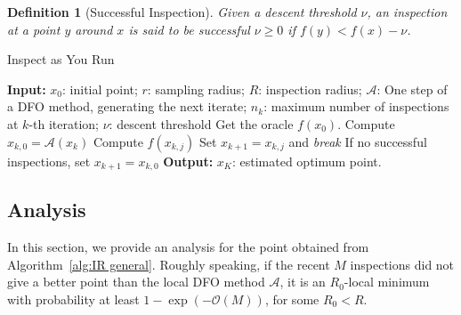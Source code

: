\documentclass[sn-mathphys,Numbered]{sn-jnl}
\theoremstyle{thmstyleone}
\theoremstyle{thmstyletwo}
\theoremstyle{thmstylethree}
\newtheorem{definition}{Definition}
\begin{document}
\begin{definition}[Successful Inspection] Given a descent threshold $\nu$, an inspection at a point $y$ around $x$ is said to be successful $\nu \geq 0$ if $f(y) < f(x) - \nu$.
\end{definition}


\begin{algorithm}[H]
\caption{Inspect as You Run}
 \label{alg:IR general}
\begin{algorithmic}[1]
  \State \textbf{Input:} $x_0$: initial point; $r$: sampling radius; $R$: inspection radius; $\mathcal{A}$: One step of a DFO method, generating the next iterate; $n_k$: maximum number of inspections at $k$-th iteration; $\nu$: descent threshold
  \State Get the oracle $f(x_0)$.
        \State Compute $x_{k, 0} = \mathcal{A}(x_k)$
            \State Compute $f(x_{k,j})$ 
                \State Set $x_{k+1} = x_{k,j}$ and \emph{break}
            \EndIf
        \EndFor
        \State If no successful inspections, set $x_{k+1} = x_{k,0}$ \label{eq: inspection step in the algorithm 1}
  \EndFor
   \State \textbf{Output:} $x_K$: estimated optimum point.
\end{algorithmic}
\end{algorithm}

\subsection{Analysis}


In this section, we provide an analysis for the point obtained from Algorithm~\ref{alg:IR general}.
Roughly speaking, if the recent $M$ inspections did not give a better point than the local DFO method $\mathcal{A}$, it is an $R_0$-local minimum with probability at least $1 - \exp(-\mathcal{O}(M))$, for some $R_0 < R$.
\end{document}
